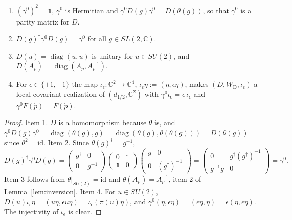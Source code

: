 \begin{lemma}\label{lem:dirac-space}
	\begin{enumerate}
		\item $(\gamma^0)^2=\mathbb{1}$, $\gamma^0$ is Hermitian and $\gamma^0D(g)\gamma^0=D(\theta(g))$, so that $\gamma^0$ is a parity matrix for $D$.
		\item $D(g)^\dagger\gamma^0D(g)=\gamma^0$ for all $g\in SL(2,\mathbb{C})$.
		\item $D(u)=\operatorname{diag}(u,u)$ is unitary for $u\in SU(2)$, and $D(A_p)=\operatorname{diag}(A_p,A_p^{-1})$.
		\item For $\epsilon\in\{+1,-1\}$ the map $\iota_\epsilon:\mathbb{C}^2\to\mathbb{C}^4$, $\iota_\epsilon\eta:=(\eta,\epsilon\eta)$, makes $(D,W_{\mathrm{D}},\iota_\epsilon)$ a local covariant realization of $(d_{1/2},\mathbb{C}^2)$ with $\gamma^0\iota_\epsilon=\epsilon\,\iota_\epsilon$ and $\gamma^0F(\mathring{p})=F(\mathring{p})$.
	\end{enumerate}
\end{lemma}

\begin{proof}
	Item 1. $D$ is a homomorphism because $\theta$ is, and $\gamma^0D(g)\gamma^0=\operatorname{diag}(\theta(g),g)=\operatorname{diag}(\theta(g),\theta(\theta(g)))=D(\theta(g))$ since $\theta^2=\mathrm{id}$. Item 2. Since $\theta(g)^\dagger=g^{-1}$,
	\begin{equation*}
		D(g)^\dagger\gamma^0D(g)=\begin{pmatrix}g^\dagger&0\\0&g^{-1}\end{pmatrix}\begin{pmatrix}0&\mathbb{1}\\\mathbb{1}&0\end{pmatrix}\begin{pmatrix}g&0\\0&(g^\dagger)^{-1}\end{pmatrix}=\begin{pmatrix}0&g^\dagger(g^\dagger)^{-1}\\g^{-1}g&0\end{pmatrix}=\gamma^0.
	\end{equation*}
	Item 3 follows from $\theta|_{SU(2)}=\mathrm{id}$ and $\theta(A_p)=A_p^{-1}$, item 2 of Lemma~\ref{lem:inversion}. Item 4. For $u\in SU(2)$, $D(u)\iota_\epsilon\eta=(u\eta,\epsilon u\eta)=\iota_\epsilon(\pi(u)\eta)$, and $\gamma^0(\eta,\epsilon\eta)=(\epsilon\eta,\eta)=\epsilon(\eta,\epsilon\eta)$. The injectivity of $\iota_\epsilon$ is clear.
\end{proof}

